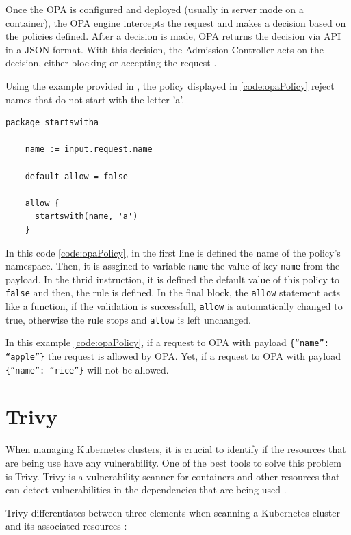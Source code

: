 \documentclass[a4paper,11pt,openright,BCOR=15mm]{scrbook}
\begin{document}
Once the OPA is configured and deployed (usually in server mode on a container), the OPA engine intercepts the request and makes a decision based on the policies defined. After a decision is made, OPA returns the decision via API in a JSON format. With this decision, the Admission Controller acts on the decision, either blocking or accepting the request \cite{opa_doc_guides_nodate}.

Using the example provided in \cite{bruner_better_2020}, the policy displayed in \ref{code:opaPolicy} reject names that do not start with the letter 'a'.

\begin{lstlisting}[style=yaml,caption={OPA policy example},label=code:opaPolicy]
	package startswitha
	
	name := input.request.name
	
	default allow = false
	
	allow {
	  startswith(name, 'a')
	}
\end{lstlisting}

In this code \ref{code:opaPolicy}, in the first line is defined the name of the policy's namespace. Then, it is assgined to variable \texttt{name} the value of key \texttt{name} from the payload. In the thrid instruction, it is defined the default value of this policy to \texttt{false} and then, the rule is defined. In the final block, the \texttt{allow} statement acts like a function, if the validation is successfull, \texttt{allow} is automatically changed to true, otherwise the rule stops and \texttt{allow} is left unchanged.

In this example \ref{code:opaPolicy}, if a request to OPA with payload \texttt{\{``name'': ``apple''\}} the request is allowed by OPA. Yet, if a request to OPA with payload \texttt{\{``name'': ``rice''\}} will not be allowed.


\section{Trivy}\label{sect:complementMonitor}

When managing Kubernetes clusters, it is crucial to identify if the resources that are being use have any vulnerability. One of the best tools to solve this problem is Trivy. Trivy is a vulnerability scanner for containers and other resources that can detect vulnerabilities in the dependencies that are being used \cite{benhassan_deep_2024}.

Trivy differentiates between three elements when scanning a Kubernetes cluster and its associated resources \cite{trivy_doc_kubernetes_nodate}:
\end{document}
